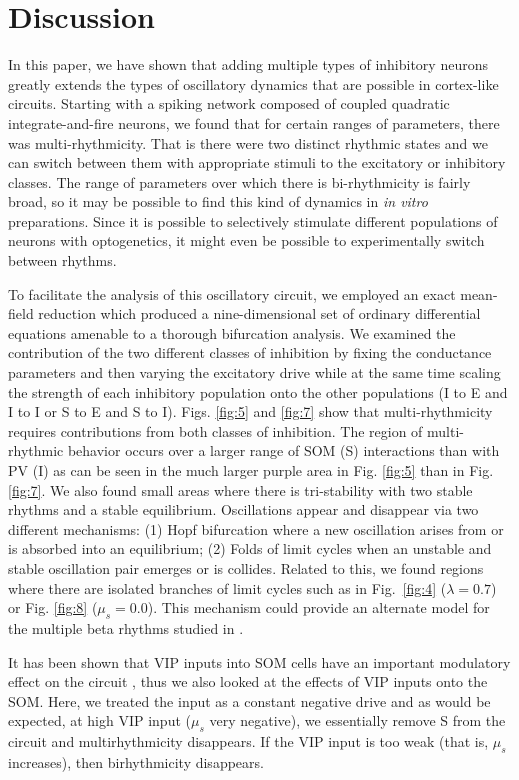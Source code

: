 \documentclass[10pt,letterpaper]{article}
\begin{document}
\section*{Discussion}

In this paper, we have shown that adding multiple types of inhibitory neurons greatly extends the types of oscillatory dynamics that are possible in cortex-like circuits. Starting with a spiking network composed of coupled quadratic integrate-and-fire neurons, we found that for certain ranges of parameters, there was multi-rhythmicity. That is there were two distinct rhythmic states and we can switch between them with appropriate stimuli to the excitatory or inhibitory classes. The range of parameters over which there is bi-rhythmicity is fairly broad, so it may be possible to find this kind of dynamics in {\em in vitro} preparations. Since it is possible to selectively stimulate different populations of neurons with optogenetics, it might even be possible to experimentally switch between rhythms.

To facilitate the analysis of this oscillatory circuit, we employed an exact mean-field reduction which produced a nine-dimensional set of ordinary differential equations amenable to a thorough bifurcation analysis. We examined the contribution of the two different classes of inhibition by fixing the conductance parameters and then varying the excitatory drive while at the same time scaling the strength of each inhibitory population onto the other populations (I to E and I to I or S to E and S to I). Figs. \ref{fig:5} and \ref{fig:7} show that multi-rhythmicity requires contributions from both classes of inhibition. The region of multi-rhythmic behavior occurs over a larger range of SOM (S) interactions than with PV (I) as can be seen in the much larger purple area in Fig. \ref{fig:5} than in Fig. \ref{fig:7}.  We also found small areas where there is tri-stability with two stable rhythms and a stable equilibrium. Oscillations appear and disappear via two different mechanisms: (1) Hopf bifurcation where a new oscillation arises from or is absorbed into an equilibrium; (2) Folds of limit cycles when an unstable and stable oscillation pair emerges or is collides.  Related to this, we found regions where there are isolated branches of limit cycles such as in Fig.~\ref{fig:4} ($\lambda=0.7$)  or Fig. \ref{fig:8} ($\mu_s=0.0$).   This mechanism could provide an alternate model for the multiple beta rhythms studied in \cite{rkc}. 

It has been shown that VIP inputs into SOM cells have an important modulatory effect on the circuit \cite{bos20,edwards24}, thus we also looked at the effects of VIP inputs onto the SOM. Here, we treated the input as a constant negative drive and as would be expected, at high VIP input ($\mu_s$ very negative), we essentially remove S from the circuit and multirhythmicity disappears.  If the VIP input is too weak (that is, $\mu_s$ increases), then birhythmicity disappears.
\end{document}
